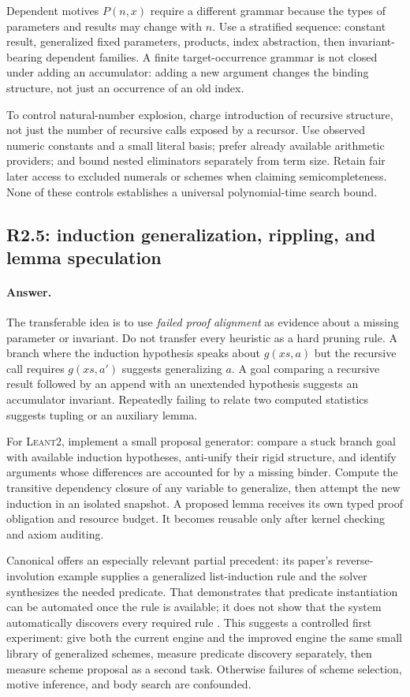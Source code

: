 \documentclass[11pt,a4paper]{article}
\newcommand{\repo}{\textsc{Leant2}}
\newcommand{\answer}{\paragraph{Answer.}}
\theoremstyle{definition}
\theoremstyle{remark}
\begin{document}
Dependent motives $P(n,x)$ require a different grammar because the types of
parameters and results may change with $n$. Use a stratified sequence: constant
result, generalized fixed parameters, products, index abstraction, then
invariant-bearing dependent families. A finite target-occurrence grammar is
not closed under adding an accumulator: adding a new argument changes the
binding structure, not just an occurrence of an old index.

To control natural-number explosion, charge introduction of recursive structure,
not just the number of recursive calls exposed by a recursor. Use observed
numeric constants and a small literal basis; prefer already available arithmetic
providers; and bound nested eliminators separately from term size. Retain fair
later access to excluded numerals or schemes when claiming semicompleteness.
None of these controls establishes a universal polynomial-time search bound.

\subsection{R2.5: induction generalization, rippling, and lemma speculation}
\answer The transferable idea is to use \emph{failed proof alignment} as evidence
about a missing parameter or invariant. Do not transfer every heuristic as a
hard pruning rule. A branch where the induction hypothesis speaks about
$g(xs,a)$ but the recursive call requires $g(xs,a')$ suggests generalizing $a$.
A goal comparing a recursive result followed by an append with an unextended
hypothesis suggests an accumulator invariant. Repeatedly failing to relate two
computed statistics suggests tupling or an auxiliary lemma.

For \repo{}, implement a small proposal generator: compare a stuck branch goal
with available induction hypotheses, anti-unify their rigid structure, and
identify arguments whose differences are accounted for by a missing binder.
Compute the transitive dependency closure of any variable to generalize, then
attempt the new induction in an isolated snapshot. A proposed lemma receives
its own typed proof obligation and resource budget. It becomes reusable only
after kernel checking and axiom auditing.

Canonical offers an especially relevant partial precedent: its paper's
reverse-involution example supplies a generalized list-induction rule and the
solver synthesizes the needed predicate. That demonstrates that predicate
instantiation can be automated once the rule is available; it does not show
that the system automatically discovers every required rule
\cite{canonical}. This suggests a controlled first experiment: give both the
current engine and the improved engine the same small library of generalized
schemes, measure predicate discovery separately, then measure scheme proposal
as a second task. Otherwise failures of scheme selection, motive inference,
and body search are confounded.
\end{document}
